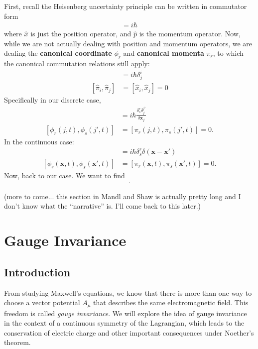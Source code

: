 \documentclass[a4paper,11pt]{article}
\numberwithin{equation}{section}
\theoremstyle{definition}
\begin{document}
First, recall the Heisenberg uncertainty principle can be written in commutator form
\begin{align}
[\hat{x},\hat{p}] = i\hbar
\end{align}
where $\hat{x}$ is just the position operator, and $\hat{p}$ is the momentum operator. Now, while we are not actually dealing with position and momentum operators, we are dealing the \textbf{canonical coordinate} $\phi_r$ and \textbf{canonical momenta} $\pi_r$, to which the canonical commutation relations still apply:
\begin{align}
[\hat{x}_i,\hat{\pi}_j] &= i\hbar \delta^i_j\\
[\hat{\pi}_i,\hat{\pi}_j] &= [\hat{x}_i,\hat{x}_j] = 0
\end{align}
Specifically in our discrete case, 
\begin{align}
[\phi_r(i,t), \pi_s(j',t)] &= i\hbar\frac{\delta^r_s \delta ^{j'}_j}{\delta \mathbf{x}_j}\\
[\phi_r(j,t),\phi_s(j',t)] &= [\pi_r(j,t), \pi_s(j',t)] = 0.
\end{align}
In the continuous case:
\begin{align}
[\phi_r(\mathbf{x},t), \pi_s(\mathbf{x}',t)] &= i\hbar\delta^r_s \delta(\mathbf{x} - \mathbf{x}')\\
[\phi_r(\mathbf{x},t),\phi_s(\mathbf{x'},t)] &= [\pi_r(\mathbf{x},t),\pi_s(\mathbf{x'},t)] = 0.
\end{align}
Now, back to our case. We want to find 
\begin{align}
[Q,\phi_r(x)].
\end{align}

(more to come... this section in Mandl and Shaw is actually pretty long and I don't know what the ``narrative'' is. I'll come back to this later.)

\newpage
\section{Gauge Invariance}
\subsection{Introduction}
From studying Maxwell's equations, we know that there is more than one way to choose a vector potential $A_\mu$ that describes the same electromagnetic field. This freedom is called \textit{gauge invariance}. We will explore the idea of gauge invariance  in the context of a continuous symmetry of the Lagrangian, which leads to the conservation of electric charge and other important consequences under Noether's theorem.\\
\end{document}
